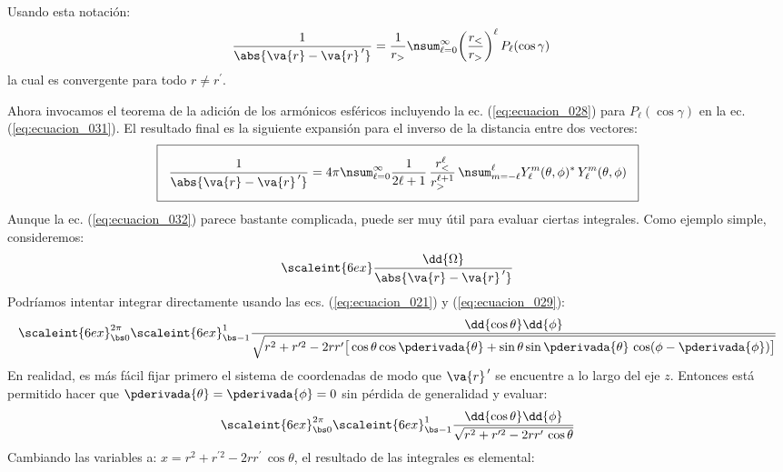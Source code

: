 Usando esta notación:
\begin{align}
\dfrac{1}{\abs{\va{r} - \va{r}^{\, \prime}}} &= \dfrac{1}{r_{>}} \nsum_{\ell=0}^{\infty} \bigg( \dfrac{r_{<}}{r_{>}} \bigg)^{\ell} \, P_{\ell} (\cos \gamma)
\label{eq:ecuacion_031}
\end{align}
la cual es convergente para todo $r \neq r^{\prime}$.
\par
Ahora invocamos el teorema de la adición de los armónicos esféricos incluyendo la ec. (\ref{eq:ecuacion_028}) para $P_{\ell} (\cos \gamma)$ en la ec. (\ref{eq:ecuacion_031}). El resultado final es la siguiente expansión para el inverso de la distancia entre dos vectores:
\begin{align}
\setlength{\fboxsep}{3\fboxsep}\boxed{
\dfrac{1}{\abs{\va{r} - \va{r}^{\, \prime}}} = 4 \pi \nsum_{\ell=0}^{\infty} \dfrac{1}{2 \ell + 1} \, \dfrac{r_{<}^{\ell}}{r_{>}^{\ell+1}} \, \nsum_{m=-\ell}^{\ell} Y_{\ell}^{m} (\theta, \phi)^{*} \, Y_{\ell}^{m} (\theta, \phi)}
\label{eq:ecuacion_032}
\end{align}
Aunque la ec. (\ref{eq:ecuacion_032}) parece bastante complicada, puede ser muy útil para evaluar ciertas integrales. Como ejemplo simple, consideremos:
\begin{align}
\scaleint{6ex} \dfrac{\dd{\Omega}}{\abs{\va{r} - \va{r}^{\, \prime}}}
\label{eq:ecuacion_033}
\end{align}
Podríamos intentar integrar directamente usando las ecs. (\ref{eq:ecuacion_021}) y (\ref{eq:ecuacion_029}):
\begin{align*}
\scaleint{6ex}_{\bs 0}^{2 \pi} \scaleint{6ex}_{\bs -1}^{1} \dfrac{\dd{\cos \theta} \dd{\phi}}{\sqrt{r^{2} + r^{\prime 2} - 2 r r^{\prime} \big[ \cos \theta \cos \pderivada{\theta} + \sin \theta \sin \pderivada{\theta} \, \cos (\phi - \pderivada{\phi}) \big]}}
\end{align*}
En realidad, es más fácil fijar primero el sistema de coordenadas de modo que $\va{r}^{\, \prime}$ se encuentre a lo largo del eje $z$. Entonces está permitido hacer que $\pderivada{\theta} = \pderivada{\phi} = 0$ sin pérdida de generalidad y evaluar:
\begin{align*}
\scaleint{6ex}_{\bs 0}^{2 \pi} \scaleint{6ex}_{\bs -1}^{1} \dfrac{\dd{\cos \theta} \dd{\phi}}{\sqrt{r^{2} + r^{\prime 2} - 2 r r^{\prime} \, \cos \theta}}
\end{align*}
Cambiando las variables a: $x = r^{2} + r^{\prime 2} - 2 r r^{\prime} \, \cos \theta$, el resultado de las integrales es elemental:

